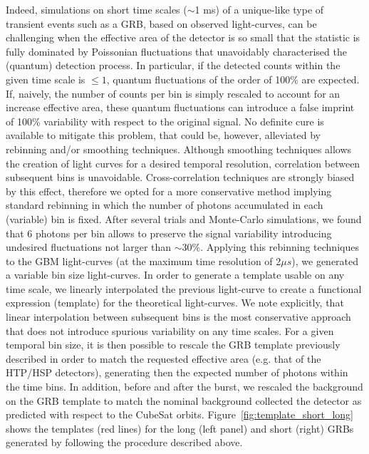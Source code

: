 \documentclass[]{spie}  %
\def \us{$\mu s$\xspace}
\begin{document}
Indeed, simulations on short time scales ($\sim$1 ms) of a unique-like type of transient events such as a GRB, based on observed light-curves, can be challenging when the effective area of the detector is so small that the statistic is fully dominated by Poissonian fluctuations that unavoidably characterised the (quantum) detection process. In particular, if the detected counts within the given time scale is $\leq1$, quantum fluctuations of the order of 100\% are expected. If, naively, the number of counts per bin is simply rescaled to account for an increase effective area, these quantum fluctuations can introduce a false imprint of 100\% variability with respect to the original signal. No definite cure is available to mitigate this problem, that could be, however, alleviated by rebinning and/or smoothing techniques. Although smoothing techniques allows the creation of light curves for a desired temporal resolution, correlation between subsequent bins is unavoidable. Cross-correlation techniques are strongly biased by this effect, therefore we opted for a more conservative method implying standard rebinning in which the number of photons accumulated in each (variable) bin is fixed. After several trials and Monte-Carlo simulations, we found that 6 photons per bin allows to preserve the signal variability introducing undesired fluctuations not larger than $\sim$30\%. Applying this rebinning techniques to the GBM light-curves (at the maximum time resolution of 2\us), we generated a variable bin size light-curves. In order to generate a template usable on any time scale, we linearly interpolated the previous light-curve to create a functional expression (template) for the theoretical light-curves. We note explicitly, that linear interpolation between subsequent bins is the most conservative approach that does not introduce spurious variability on any time scales. For a given temporal bin size, it is then possible to rescale the GRB template previously described in order to match the requested effective area (e.g. that of the HTP/HSP detectors), generating then the expected number of photons within the time bins. In addition, before and after the burst, we rescaled the background on the GRB template to match the nominal background collected the detector as predicted with respect to the CubeSat orbits. Figure~\ref{fig:template_short_long} shows the templates (red lines) for the long (left panel) and short (right) GRBs generated by following the procedure described above. 
\end{document}
